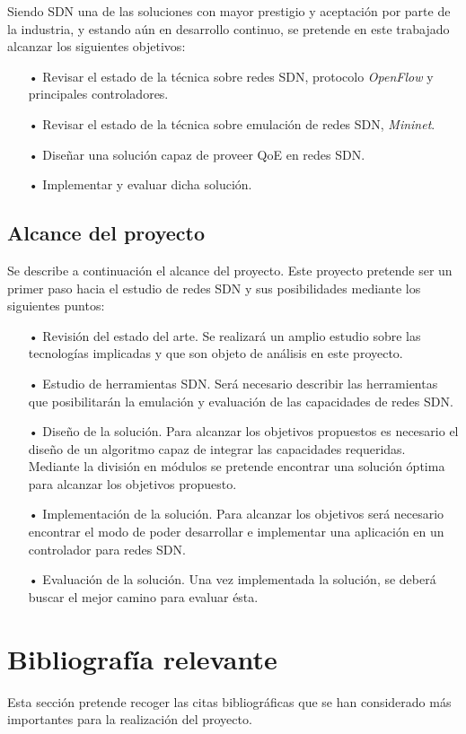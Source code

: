 \documentclass[a4paper,11pt]{book}
\begin{document}
Siendo \ac{SDN} una de las soluciones con mayor prestigio y aceptación por parte de la industria, y estando aún en desarrollo continuo, se pretende en este trabajado alcanzar los siguientes objetivos:

\begin{itemize}
\item[•] Revisar el estado de la técnica sobre redes \ac{SDN}, protocolo \emph{OpenFlow} y principales controladores.
\item[•] Revisar el estado de la técnica sobre emulación de redes SDN, \emph{Mininet}.
\item[•] Diseñar una solución capaz de proveer \ac{QoE} en redes \ac{SDN}.
\item[•] Implementar y evaluar dicha solución.
\end{itemize}

\subsection{Alcance del proyecto}
Se describe a continuación el alcance del proyecto. Este proyecto pretende ser un primer paso hacia el estudio de redes \ac{SDN} y sus posibilidades mediante los siguientes puntos:
\begin{itemize}
\item[•] Revisión del estado del arte. Se realizará un amplio estudio sobre las tecnologías implicadas y que son objeto de análisis en este proyecto.
\item[•] Estudio de herramientas \ac{SDN}. Será necesario describir las herramientas que posibilitarán la emulación y evaluación de las capacidades de redes \ac{SDN}.
\item[•] Diseño de la solución. Para alcanzar los objetivos propuestos es necesario el diseño de un algoritmo capaz de integrar las capacidades requeridas. Mediante la división en módulos se pretende encontrar una solución óptima para alcanzar los objetivos propuesto.
\item[•] Implementación de la solución. Para alcanzar los objetivos será necesario encontrar el modo de poder desarrollar e implementar una aplicación en un controlador para redes \ac{SDN}. 
\item[•] Evaluación de la solución. Una vez implementada la solución, se deberá buscar el mejor camino para evaluar ésta.
\end{itemize}

\section{Bibliografía relevante}
Esta sección pretende recoger las citas bibliográficas que se han considerado más importantes para la realización del proyecto.
\end{document}
